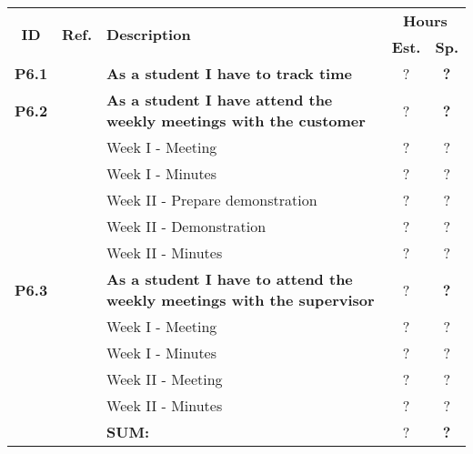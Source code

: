\label{tab:sprint6storiesProcess}
\def\arraystretch{1.25}
 
\begin{longtable}{ccXcc}

\toprule[0.5mm]
\multirow{2}{*}{\textbf{ID}} &
\multirow{2}{*}{\textbf{Ref.}} & \multirow{2}{*}{\textbf{Description}} & \multicolumn{2}{c}{\textbf{Hours}} \\
 					& & & \textbf{Est.} & \textbf{Sp.} \\

\midrule

\textbf{P6.1} 	&& {\bf  As a student I have to track time} 										& 	?	& \textbf{?} \\
	
\textbf{P6.2} 	&& {\bf As a student I have attend the weekly meetings with the customer} 			& 	?	& \textbf{?} \\
		&& Week I - Meeting							&  ? & ? \\
		&& Week I - Minutes							&  ? & ? \\
		&& Week II - Prepare demonstration			&  ? & ? \\
		&& Week II - Demonstration					&  ? & ? \\
		&& Week II - Minutes						&  ? & ? \\


		
\textbf{P6.3} 	&& {\bf As a student I have to attend the weekly meetings with the supervisor} 		& 	?	& \textbf{?} \\
		&& Week I - Meeting							& ?  & ? \\
		&& Week I - Minutes							& ?  & ? \\
		&& Week II - Meeting						& ?  & ? \\
		&& Week II - Minutes						& ?  & ? \\

				
				
\hline
				&& \textbf{SUM:}		&		?	& \textbf{?}
 \\																			
\bottomrule[0.5mm]
\end{longtable}

